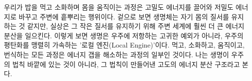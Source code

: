 우리가 밥을 먹고 소화하며 몸을 움직이는 과정은 고밀도 에너지를 끌어와 저밀도 에너지로 바꾸고 주변에 흩뿌리는 행위이다. 겉으로 보면 생명체는 자기 몸의 질서를 유지하는 것 같지만, 실상은 그 작은 질서를 유지하기 위해 주변 세계에 훨씬 더 큰 에너지 분산을 일으킨다. 이렇게 보면 생명은 우주에 저항하는 고귀한 예외가 아니라, 우주의 평탄화를 맹렬히 가속하는 '로컬 엔진(Local Engine)'이다. 먹고, 소화하고, 움직이고, 번식하는 모든 과정은 에너지 갭을 해소하는 과정의 일부인 것이다. 나는 생명이 우주의 법칙 바깥에 있는 것이 아니라, 그 법칙이 만들어낸 고도의 에너지 분산 구조라고 본다.

